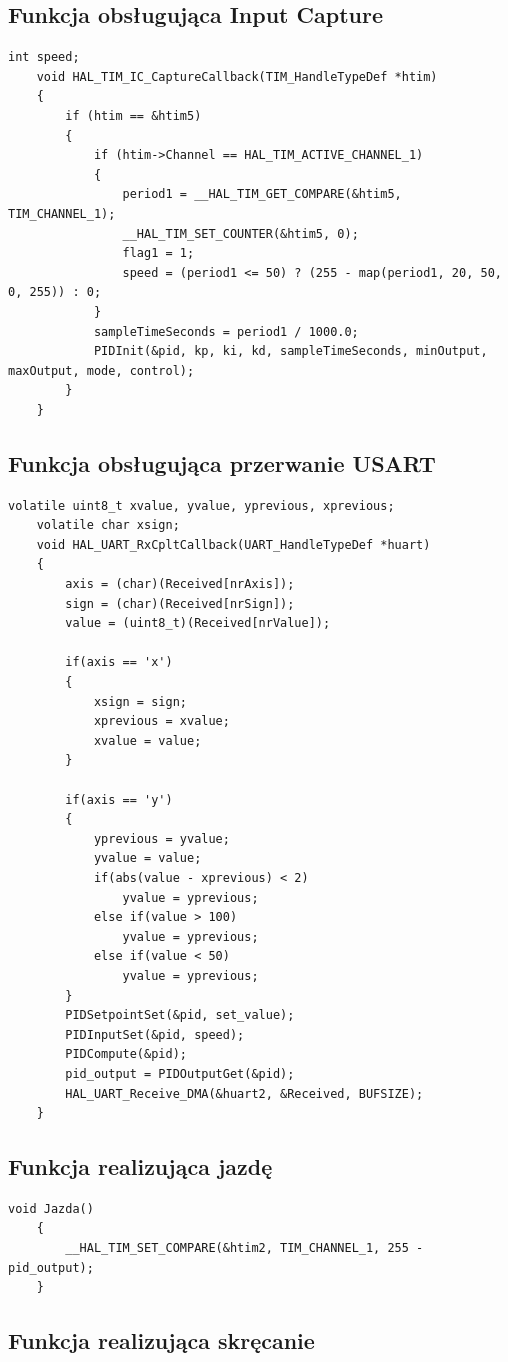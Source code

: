 \documentclass[10pt, a4paper]{article}
\begin{document}
\subsection{Funkcja obsługująca Input Capture}
	\begin{lstlisting}[tabsize=2]
	int speed;
	void HAL_TIM_IC_CaptureCallback(TIM_HandleTypeDef *htim)
	{
		if (htim == &htim5)
		{
			if (htim->Channel == HAL_TIM_ACTIVE_CHANNEL_1)
			{
				period1 = __HAL_TIM_GET_COMPARE(&htim5, TIM_CHANNEL_1);
				__HAL_TIM_SET_COUNTER(&htim5, 0);
				flag1 = 1;
				speed = (period1 <= 50) ? (255 - map(period1, 20, 50, 0, 255)) : 0;
			}
			sampleTimeSeconds = period1 / 1000.0;
			PIDInit(&pid, kp, ki, kd, sampleTimeSeconds, minOutput, maxOutput, mode, control);
		}
	}
	\end{lstlisting}

\subsection{Funkcja obsługująca przerwanie USART}

	\begin{lstlisting}[tabsize=2]
	volatile uint8_t xvalue, yvalue, yprevious, xprevious;
	volatile char xsign;
	void HAL_UART_RxCpltCallback(UART_HandleTypeDef *huart) 
	{
		axis = (char)(Received[nrAxis]);
		sign = (char)(Received[nrSign]);
		value = (uint8_t)(Received[nrValue]);
		
		if(axis == 'x')
		{
			xsign = sign;
			xprevious = xvalue;
			xvalue = value;
		}
		
		if(axis == 'y')
		{
			yprevious = yvalue;
			yvalue = value;
			if(abs(value - xprevious) < 2)
				yvalue = yprevious;
			else if(value > 100)
				yvalue = yprevious;
			else if(value < 50)
				yvalue = yprevious;
		}
		PIDSetpointSet(&pid, set_value);
		PIDInputSet(&pid, speed);
		PIDCompute(&pid);
		pid_output = PIDOutputGet(&pid);
		HAL_UART_Receive_DMA(&huart2, &Received, BUFSIZE);
	}
	\end{lstlisting}
	
	\subsection{Funkcja realizująca jazdę}
	
	\begin{lstlisting}[tabsize=2]
	void Jazda()
	{
		__HAL_TIM_SET_COMPARE(&htim2, TIM_CHANNEL_1, 255 - pid_output);
	}
	\end{lstlisting}
	
	\subsection{Funkcja realizująca skręcanie}
	
\end{document}
